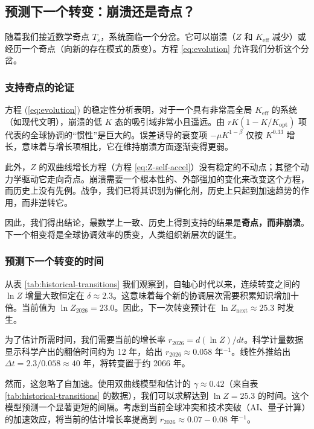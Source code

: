 \documentclass[12pt,a4paper]{article}
\theoremstyle{remark}
\begin{document}
		\subsection{预测下一个转变：崩溃还是奇点？}
		
		随着我们接近数学奇点 $T_s$，系统面临一个分岔。它可以崩溃（$Z$ 和 $K_{\text{eff}}$ 减少）或经历一个奇点（向新的存在模式的质变）。方程 \ref{eq:evolution} 允许我们分析这个分岔。
		
		\subsubsection{支持奇点的论证}
		
		方程 (\ref{eq:evolution}) 的稳定性分析表明，对于一个具有非常高全局 $K_{\text{eff}}$ 的系统（如现代文明），崩溃的低 $K$ 态的吸引域非常小且遥远。由 $rK(1-K/K_{\text{opt}})$ 项代表的全球协调的“惯性”是巨大的。误差诱导的衰变项 $-\mu K^{1-\beta}$ 仅按 $K^{0.33}$ 增长，意味着与增长项相比，它在维持崩溃方面逐渐变得更弱。
		
		此外，$Z$ 的双曲线增长方程（方程 \ref{eq:Z-self-accel}）没有稳定的不动点；其整个动力学驱动它走向奇点。崩溃需要一个根本性的、外部强加的变化来改变这个方程，而历史上没有先例。战争，我们已将其识别为催化剂，历史上只起到加速趋势的作用，而非逆转它。
		
		因此，我们得出结论，最数学上一致、历史上得到支持的结果是\textbf{奇点，而非崩溃}。下一个相变将是全球协调效率的质变，人类组织新层次的诞生。
		
		\subsubsection{预测下一个转变的时间}
		
		从表 \ref{tab:historical-transitions} 我们观察到，自轴心时代以来，连续转变之间的 $\ln Z$ 增量大致恒定在 $\delta \approx 2.3$。这意味着每个新的协调层次需要积累知识增加十倍。当前值为 $\ln Z_{2026} = 23.0$。因此，下一次转变预计在 $\ln Z_{\text{next}} \approx 25.3$ 时发生。
		
		为了估计所需时间，我们需要当前的增长率 $r_{2026} = d(\ln Z)/dt$。科学计量数据 \cite{Bornmann2015} 显示科学产出的翻倍时间约为 12 年，给出 $r_{2026} \approx 0.058$ 年$^{-1}$。线性外推给出 $\Delta t = 2.3 / 0.058 \approx 40$ 年，将转变置于约 2066 年。
		
		然而，这忽略了自加速。使用双曲线模型和估计的 $\gamma \approx 0.42$（来自表 \ref{tab:historical-transitions} 的数据），我们可以求解达到 $\ln Z = 25.3$ 的时间。这个模型预测一个显著更短的间隔。考虑到当前全球冲突和技术突破（AI、量子计算）的加速效应，将当前的估计增长率提高到 $r_{2026} \approx 0.07-0.08$ 年$^{-1}$。
		
\end{document}
